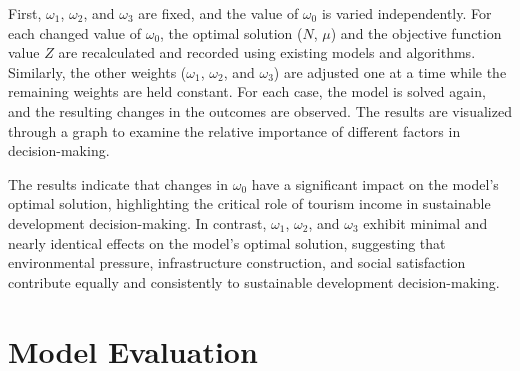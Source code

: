 \documentclass{mcmthesis}
\begin{document}
{First, $\omega_1$, $\omega_2$, and $\omega_3$ are fixed, and the value of $\omega_0$ is varied independently. For each changed value of $\omega_0$, the optimal solution ($N$, $\mu$) and the objective function value $Z$ are recalculated and recorded using existing models and algorithms. Similarly, the other weights ($\omega_1$, $\omega_2$, and $\omega_3$) are adjusted one at a time while the remaining weights are held constant. For each case, the model is solved again, and the resulting changes in the outcomes are observed. The results are visualized through a graph to examine the relative importance of different factors in decision-making.}

{The results indicate that changes in $\omega_0$ have a significant impact on the model's optimal solution, highlighting the critical role of tourism income in sustainable development decision-making. In contrast, $\omega_1$, $\omega_2$, and $\omega_3$ exhibit minimal and nearly identical effects on the model's optimal solution, suggesting that environmental pressure, infrastructure construction, and social satisfaction contribute equally and consistently to sustainable development decision-making.}

\section{Model Evaluation}
\end{document}
